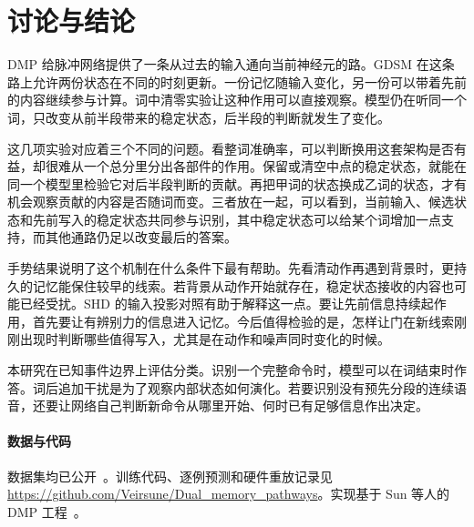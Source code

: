 \documentclass[11pt]{article}
\newcommand{\pid}[1]{\ifstrequal{#1}{摘要}{}{\leavevmode\llap{\scriptsize\sffamily #1\hspace{.65em}}}\ignorespaces}
\begin{document}
\section{讨论与结论}
\pid{6-P1} DMP 给脉冲网络提供了一条从过去的输入通向当前神经元的路。GDSM 在这条路上允许两份状态在不同的时刻更新。一份记忆随输入变化，另一份可以带着先前的内容继续参与计算。词中清零实验让这种作用可以直接观察。模型仍在听同一个词，只改变从前半段带来的稳定状态，后半段的判断就发生了变化。

\pid{6-P2} 这几项实验对应着三个不同的问题。看整词准确率，可以判断换用这套架构是否有益，却很难从一个总分里分出各部件的作用。保留或清空中点的稳定状态，就能在同一个模型里检验它对后半段判断的贡献。再把甲词的状态换成乙词的状态，才有机会观察贡献的内容是否随词而变。三者放在一起，可以看到，当前输入、候选状态和先前写入的稳定状态共同参与识别，其中稳定状态可以给某个词增加一点支持，而其他通路仍足以改变最后的答案。

\pid{6-P3} 手势结果说明了这个机制在什么条件下最有帮助。先看清动作再遇到背景时，更持久的记忆能保住较早的线索。若背景从动作开始就存在，稳定状态接收的内容也可能已经受扰。SHD 的输入投影对照有助于解释这一点。要让先前信息持续起作用，首先要让有辨别力的信息进入记忆。今后值得检验的是，怎样让门在新线索刚刚出现时判断哪些值得写入，尤其是在动作和噪声同时变化的时候。

\pid{6-P4} 本研究在已知事件边界上评估分类。识别一个完整命令时，模型可以在词结束时作答。词后追加干扰是为了观察内部状态如何演化。若要识别没有预先分段的连续语音，还要让网络自己判断新命令从哪里开始、何时已有足够信息作出决定。

\paragraph{数据与代码}
\pid{6-P5} 数据集均已公开~\cite{shd,gesture,mnist}。训练代码、逐例预测和硬件重放记录见 \url{https://github.com/Veirsune/Dual_memory_pathways}。实现基于 Sun 等人的 DMP 工程~\cite{dmp}。


\end{document}
